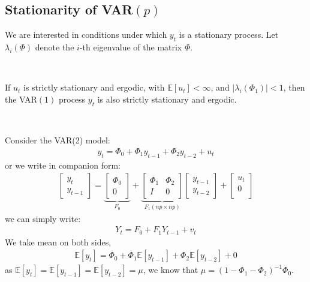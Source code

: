 \subsection{Stationarity of VAR\texorpdfstring{$(p)$}{(p)}}\label{sec:stationarity-var}
We are interested in conditions under which $y_t$ is a stationary process.
Let $\lambda_i(\Phi)$ denote the $i$-th eigenvalue of the matrix $\Phi$.
\begin{theorem}\label{thm:stationarity-var1}
    \

    If $u_t$ is strictly stationary and ergodic, with $\mathbb{E}[u_t] < \infty$, and $\vert \lambda_i(\Phi_1) \vert < 1$,
    then the VAR$(1)$ process $y_t$ is also strictly stationary and ergodic.
\end{theorem}
\begin{eg}
    \

    Consider the VAR(2) model:
    \begin{gather*}
        y_t = \Phi_0 + \Phi_1 y_{t-1} + \Phi_2 y_{t-2} + u_t
    \end{gather*}
    or we write in companion form:
    \begin{gather*}
        \begin{bmatrix}
            y_t \\
            y_{t-1}
        \end{bmatrix} = \underset{F_0}{\underbrace{\begin{bmatrix}
            \Phi_0 \\
            0
        \end{bmatrix}}} + 
        \underset{F_1(np \times np)}{\underbrace{\begin{bmatrix}
            \Phi_1 & \Phi_2 \\
            I & 0
        \end{bmatrix}}}
        \begin{bmatrix}
            y_{t-1} \\
            y_{t-2}
        \end{bmatrix} + \begin{bmatrix}
             u_t \\
             0 \\
        \end{bmatrix}
    \end{gather*}
    we can simply write:
    \begin{gather*}
        Y_t = F_0 + F_1 Y_{t-1} + v_t
    \end{gather*}
    We take mean on both sides,
    \begin{gather*}
        \mathbb{E}[y_t] = \Phi_0 + \Phi_1 \mathbb{E}[y_{t-1}] + \Phi_2 \mathbb{E}[y_{t-2}] + 0
    \end{gather*}
    as $\mathbb{E}[y_t] = \mathbb{E}[y_{t-1}] = \mathbb{E}[y_{t-2}] = \mu$,
    we know that $\mu = \left(1 - \Phi_1 - \Phi_2\right)^{-1} \Phi_0.$
\end{eg}
